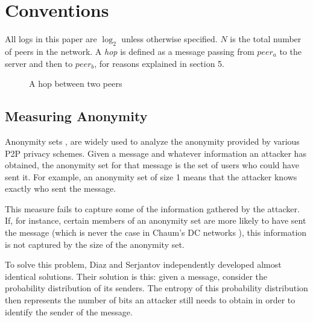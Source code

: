\documentclass[twocolumn,11pt,english]{article}
\begin{document}
\section{Conventions}
All logs in this paper are $\log_2$ unless otherwise specified. $N$ is the total number of peers in the network. A \textit{hop} is defined as a message passing from $peer_a$ to the server and then to $peer_b$, for reasons explained in section 5.
\begin{figure}[ht]
  \begin{center}
  \end{center}
\caption{A hop between two peers}
\end{figure}


\subsection{Measuring Anonymity}
Anonymity sets \cite{chaum-dc}, are widely used to analyze the anonymity provided by various P2P privacy schemes. Given a message and whatever information an attacker has obtained, the anonymity set for that message is the set of users who could have sent it. For example, an anonymity set of size 1 means that the attacker knows exactly who sent the message.

This measure fails to capture some of the information gathered by the attacker. If, for instance, certain members of an anonymity set are more likely to have sent the message (which is never the case in Chaum's DC networks \cite{chaum-dc}), this information is not captured by the size of the anonymity set. 

To solve this problem, Diaz \cite{Diaz02} and Serjantov \cite{Serj02} independently developed almost identical solutions. Their solution is this: given a message, consider the probability distribution of its senders. The entropy of this probability distribution then represents the number of bits an attacker still needs to obtain in order to identify the sender of the message. 
\end{document}
